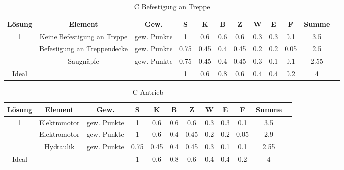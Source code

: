 \documentclass[10pt,a4paper]{article}
\begin{document}
\begin{table}[h!]
    \centering
    \begin{tabular}{cccccccccccc}
        \toprule
        \textbf{Lösung} & \textbf{Element}            & \textbf{Gew.} & \textbf{S} & \textbf{K} & \textbf{B} & \textbf{Z} & \textbf{W} & \textbf{E} & \textbf{F} & \textbf{Summe} & \\
        \midrule
        1               & Keine Befestigung an Treppe & gew. Punkte   & 1          & 0.6        & 0.6        & 0.6        & 0.3        & 0.3        & 0.1        & 3.5              \\
        \addlinespace
        2               & Befestigung an Treppendecke & gew. Punkte   & 0.75       & 0.45       & 0.4        & 0.45       & 0.2        & 0.2        & 0.05       & 2.5              \\
        \addlinespace
        3               & Saugnäpfe                   & gew. Punkte   & 0.75       & 0.45       & 0.4        & 0.45       & 0.3        & 0.1        & 0.1        & 2.55             \\
        \midrule
        Ideal           &                             &               & 1          & 0.6        & 0.8        & 0.6        & 0.4        & 0.4        & 0.2        & 4                \\
        \bottomrule
    \end{tabular}
    \caption{C Befestigung an Treppe}
    \label{tab:befestigung_treppe}
\end{table}
\begin{table}[h!]
    \centering
    \begin{tabular}{cccccccccccc}
        \toprule
        \textbf{Lösung} & \textbf{Element} & \textbf{Gew.} & \textbf{S} & \textbf{K} & \textbf{B} & \textbf{Z} & \textbf{W} & \textbf{E} & \textbf{F} & \textbf{Summe} & \\
        \midrule
        1               & Elektromotor     & gew. Punkte   & 1          & 0.6        & 0.6        & 0.6        & 0.3        & 0.3        & 0.1        & 3.5              \\
        \addlinespace
        2               & Elektromotor     & gew. Punkte   & 1          & 0.6        & 0.4        & 0.45       & 0.2        & 0.2        & 0.05       & 2.9              \\
        \addlinespace
        3               & Hydraulik        & gew. Punkte   & 0.75       & 0.45       & 0.4        & 0.45       & 0.3        & 0.1        & 0.1        & 2.55             \\
        \midrule
        Ideal           &                  &               & 1          & 0.6        & 0.8        & 0.6        & 0.4        & 0.4        & 0.2        & 4                \\
        \bottomrule
    \end{tabular}
    \caption{C Antrieb}
    \label{tab:antrieb}
\end{table}
\end{document}
